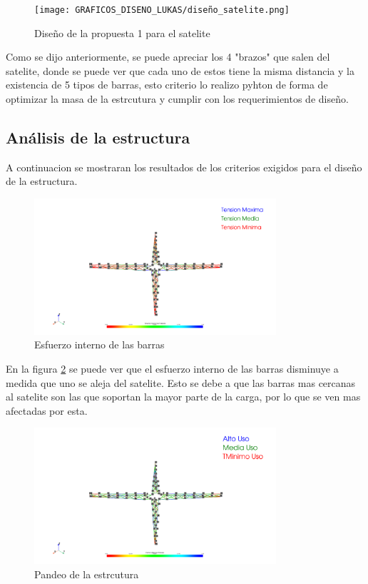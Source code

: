 \begin{figure}[H]
    \centering
    \texttt{[image: GRAFICOS\_DISENO\_LUKAS/diseño\_satelite.png]}
    \caption{Diseño de la propuesta 1 para el satelite}
    \label{fig:propuesta1}
\end{figure}

Como se dijo anteriormente, se puede apreciar los 4 "brazos" que salen del satelite, donde se puede ver que cada uno de estos tiene la misma distancia y la existencia de 5 tipos de barras, esto criterio lo realizo pyhton de forma de optimizar la masa de la estrcutura y cumplir con los requerimientos de diseño.

\subsection{Análisis de la estructura}

A continuacion se mostraran los resultados de los criterios exigidos para el diseño de la estructura.

\begin{figure}[H]
    \centering
    \includegraphics[width=0.8\textwidth]{GRAFICOS_DISENO_LUKAS/esfuerzo_barras_inercia.png}
    \caption{Esfuerzo interno de las barras}
    \label{fig:propuesta1_ei}
\end{figure}

En la figura \ref{fig:propuesta1_ei} se puede ver que el esfuerzo interno de las barras disminuye a medida que uno se aleja del satelite. Esto se debe a que las barras mas cercanas al satelite son las que soportan la mayor parte de la carga, por lo que se ven mas afectadas por esta.

\begin{figure}[H]
    \centering
    \includegraphics[width=0.8\textwidth]{GRAFICOS_DISENO_LUKAS/factor_utilizacion_pandeo.png}
    \caption{Pandeo de la estrcutura}
    \label{fig:propuesta1_pandeo}
\end{figure}

